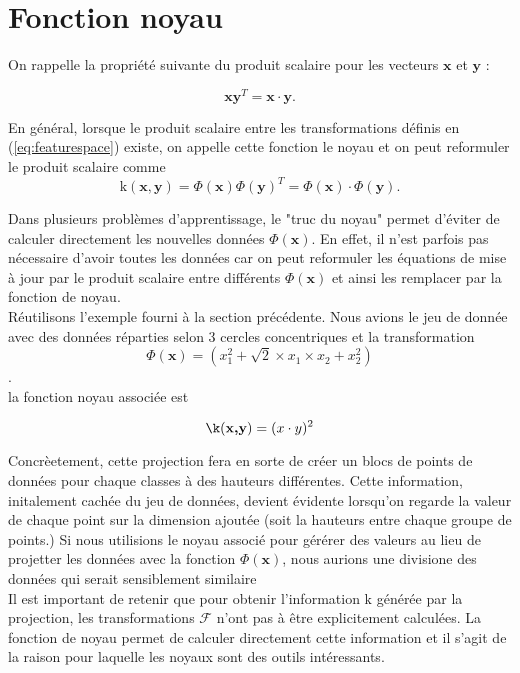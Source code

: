\section{Fonction noyau}\label{sec:kernel}

On rappelle la propriété suivante du produit scalaire pour les vecteurs $\textbf{x}$ et $\textbf{y}$ : 

$$\textbf{x}\textbf{y}^T = \textbf{x} \cdot \textbf{y}.$$

En général, lorsque le produit scalaire entre les transformations définis en (\ref{eq:featurespace}) existe, on appelle cette fonction le noyau et on peut reformuler le produit scalaire comme
$$\textrm{k}(\textbf{x}, \textbf{y}) = \Phi(\textbf{x})\Phi(\textbf{y})^T = \Phi(\textbf{x})\cdot \Phi(\textbf{y}).$$

Dans plusieurs problèmes d'apprentissage, le "truc du noyau" permet d'éviter de calculer directement les nouvelles données $\Phi(\textbf{x})$. 
En effet, il n'est parfois pas nécessaire d'avoir toutes les données car on peut reformuler les équations de mise à jour par le produit scalaire 
entre différents $\Phi(\textbf{x})$ et ainsi les remplacer par la fonction de noyau. \\

Réutilisons l'exemple fourni à la section précédente. Nous avions le jeu de donnée avec des données réparties selon 3 cercles concentriques 
et la transformation $$\Phi(\textbf{x})= (x_1^2 + \sqrt{2} \times x_1\times x_2 + x_2^2)$$. \\ la fonction noyau associée est

$$\k(\textbf{x,y})= (x \cdot y)^2$$

Concrèetement, cette projection fera en sorte de créer un blocs de points de données pour chaque classes à des hauteurs différentes. Cette information, 
initalement cachée du jeu de données, devient évidente lorsqu'on regarde la valeur de chaque point sur la dimension ajoutée (soit la hauteurs entre chaque groupe de points.)
Si nous utilisions le noyau associé pour gérérer des valeurs au lieu de projetter les données avec la fonction $\Phi(\textbf{x})$,
nous aurions une divisione des données qui serait sensiblement similaire \\ 

Il est important de retenir que pour obtenir l’information $\textrm{k}$ générée par la projection, les transformations $\mathcal{F}$ n'ont pas à être explicitement calculées. 
La fonction de noyau permet de calculer directement cette information et il s’agit de la raison pour laquelle les noyaux sont des outils intéressants. \\

